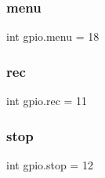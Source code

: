 \subsubsection{\texorpdfstring{menu}{menu}}
{\footnotesize\ttfamily int gpio.\+menu = 18}

\mbox{\label{namespacegpio_ac4b0388fe69e716c5162432e3cdb535e}} 
\subsubsection{\texorpdfstring{rec}{rec}}
{\footnotesize\ttfamily int gpio.\+rec = 11}

\mbox{\label{namespacegpio_a00bc49404c7d994457664d6352bb2779}} 
\subsubsection{\texorpdfstring{stop}{stop}}
{\footnotesize\ttfamily int gpio.\+stop = 12}

